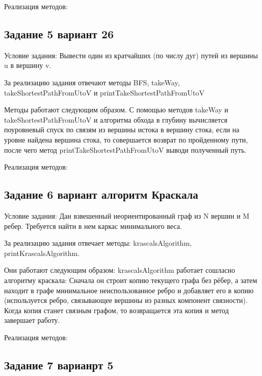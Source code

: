 \documentclass[bachelor, och, pract]{SCWorks}
\begin{document}
Реализация методов:
\smallskip


\bigskip

\subsection{Задание 5 вариант 26}

Условие задания: Вывести один из кратчайших (по числу дуг) путей из вершины u в вершину v.
\bigskip

За реализацию задания отвечают методы BFS, takeWay,
takeShortestPathFromUtoV и printTakeShortestPathFromUtoV
\bigskip

Методы работают следующим образом. С помощью методов takeWay
и takeShortestPathFromUtoV и алгоритма обхода в глубину вычисляется
поуровневый спуск по связям из вершины истока в вершину стока,
если на уровне найдена вершина стока, то совершается возврат по
пройденному пути, после чего метод printTakeShortestPathFromUtoV
выводи полученный путь.
\bigskip

Реализация методов:
\bigskip


\bigskip

\subsection{Задание 6 вариант алгоритм Краскала}

Условие задания: Дан взвешенный неориентированный граф из N вершин и M ребер. Требуется найти в нем каркас минимального веса.
\bigskip

За реализацию задания отвечает методы: krascalsAlgorithm, printKrascalsAlgorithm.
\bigskip

Они работают следующим образом: krascalsAlgorithm работает сошласно алгоритму краскала:
Сначала он строит копию текущего графа без рёбер, а затем находит в графе минимальное
неиспользованное ребро и добавляет его в копию (используется ребро, связывающее
вершины из разных компонент связности). Когда копия станет связным графом, то
возвращается эта копия и метод завершает работу.
\bigskip

Реализация методов:
\bigskip


\bigskip

\subsection{Задание 7 варианрт 5}
\end{document}
